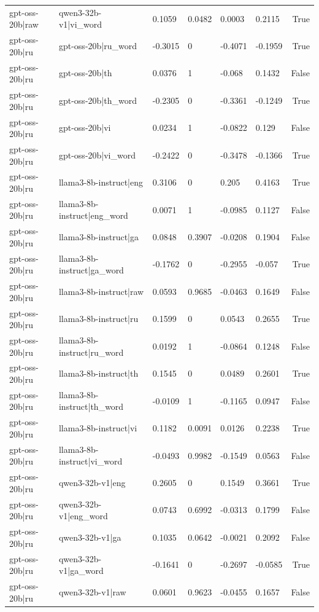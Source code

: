 \begin{table}
\begin{tabular}{llllllr}
gpt-oss-20b|raw & qwen3-32b-v1|vi_word & 0.1059 & 0.0482 & 0.0003 & 0.2115 & True \\
gpt-oss-20b|ru & gpt-oss-20b|ru_word & -0.3015 & 0 & -0.4071 & -0.1959 & True \\
gpt-oss-20b|ru & gpt-oss-20b|th & 0.0376 & 1 & -0.068 & 0.1432 & False \\
gpt-oss-20b|ru & gpt-oss-20b|th_word & -0.2305 & 0 & -0.3361 & -0.1249 & True \\
gpt-oss-20b|ru & gpt-oss-20b|vi & 0.0234 & 1 & -0.0822 & 0.129 & False \\
gpt-oss-20b|ru & gpt-oss-20b|vi_word & -0.2422 & 0 & -0.3478 & -0.1366 & True \\
gpt-oss-20b|ru & llama3-8b-instruct|eng & 0.3106 & 0 & 0.205 & 0.4163 & True \\
gpt-oss-20b|ru & llama3-8b-instruct|eng_word & 0.0071 & 1 & -0.0985 & 0.1127 & False \\
gpt-oss-20b|ru & llama3-8b-instruct|ga & 0.0848 & 0.3907 & -0.0208 & 0.1904 & False \\
gpt-oss-20b|ru & llama3-8b-instruct|ga_word & -0.1762 & 0 & -0.2955 & -0.057 & True \\
gpt-oss-20b|ru & llama3-8b-instruct|raw & 0.0593 & 0.9685 & -0.0463 & 0.1649 & False \\
gpt-oss-20b|ru & llama3-8b-instruct|ru & 0.1599 & 0 & 0.0543 & 0.2655 & True \\
gpt-oss-20b|ru & llama3-8b-instruct|ru_word & 0.0192 & 1 & -0.0864 & 0.1248 & False \\
gpt-oss-20b|ru & llama3-8b-instruct|th & 0.1545 & 0 & 0.0489 & 0.2601 & True \\
gpt-oss-20b|ru & llama3-8b-instruct|th_word & -0.0109 & 1 & -0.1165 & 0.0947 & False \\
gpt-oss-20b|ru & llama3-8b-instruct|vi & 0.1182 & 0.0091 & 0.0126 & 0.2238 & True \\
gpt-oss-20b|ru & llama3-8b-instruct|vi_word & -0.0493 & 0.9982 & -0.1549 & 0.0563 & False \\
gpt-oss-20b|ru & qwen3-32b-v1|eng & 0.2605 & 0 & 0.1549 & 0.3661 & True \\
gpt-oss-20b|ru & qwen3-32b-v1|eng_word & 0.0743 & 0.6992 & -0.0313 & 0.1799 & False \\
gpt-oss-20b|ru & qwen3-32b-v1|ga & 0.1035 & 0.0642 & -0.0021 & 0.2092 & False \\
gpt-oss-20b|ru & qwen3-32b-v1|ga_word & -0.1641 & 0 & -0.2697 & -0.0585 & True \\
gpt-oss-20b|ru & qwen3-32b-v1|raw & 0.0601 & 0.9623 & -0.0455 & 0.1657 & False \\

\end{tabular}
\end{table}
